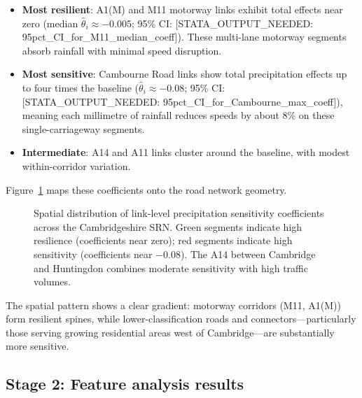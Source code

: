 \documentclass[review]{elsarticle}
\begin{document}
\begin{itemize}
    \item \textbf{Most resilient}: A1(M) and M11 motorway links exhibit total effects near zero (median $\hat{\theta}_i \approx -0.005$; 95\% CI: [STATA\_OUTPUT\_NEEDED: 95pct\_CI\_for\_M11\_median\_coeff]). These multi-lane motorway segments absorb rainfall with minimal speed disruption.
    \item \textbf{Most sensitive}: Cambourne Road links show total precipitation effects up to four times the baseline ($\hat{\theta}_i \approx -0.08$; 95\% CI: [STATA\_OUTPUT\_NEEDED: 95pct\_CI\_for\_Cambourne\_max\_coeff]), meaning each millimetre of rainfall reduces speeds by about 8\% on these single-carriageway segments.
    \item \textbf{Intermediate}: A14 and A11 links cluster around the baseline, with modest within-corridor variation.
\end{itemize}

Figure~\ref{fig:spatial_coef} maps these coefficients onto the road network geometry.

\begin{figure}[htbp]
\centering
\caption{Spatial distribution of link-level precipitation sensitivity coefficients across the Cambridgeshire SRN. Green segments indicate high resilience (coefficients near zero); red segments indicate high sensitivity (coefficients near $-$0.08). The A14 between Cambridge and Huntingdon combines moderate sensitivity with high traffic volumes.}
\label{fig:spatial_coef}
\end{figure}

The spatial pattern shows a clear gradient: motorway corridors (M11, A1(M)) form resilient spines, while lower-classification roads and connectors---particularly those serving growing residential areas west of Cambridge---are substantially more sensitive.


\subsection{Stage 2: Feature analysis results}
\label{sec:results:feature}
\end{document}
